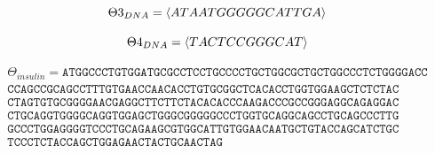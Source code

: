 \documentclass[a4paper, 18pt]{book} %
\begin{document}
\begin{equation}
{\Theta3}_{DNA} = \langle ATA ATGG GGG CAT TGA \rangle\\
\end{equation}

\begin{equation}
{\Theta4}_{DNA} = \langle TAC TCC GGG CAT\rangle\\
\end{equation}

\begin{multline}
\Theta_{insulin} =  \texttt{ATGGCCCTGTGGATGCGCCTCCTGCCCCTGCTGGCGCTGCTGGCCCTCTGGGGACC}\\
\texttt{CCAGCCGCAGCCTTTGTGAACCAACACCTGTGCGGCTCACACCTGGTGGAAGCTCTCTAC}\\
\texttt{CTAGTGTGCGGGGAACGAGGCTTCTTCTACACACCCAAGACCCGCCGGGAGGCAGAGGAC}\\
\texttt{CTGCAGGTGGGGCAGGTGGAGCTGGGCGGGGGCCCTGGTGCAGGCAGCCTGCAGCCCTTG}\\
\texttt{GCCCTGGAGGGGTCCCTGCAGAAGCGTGGCATTGTGGAACAATGCTGTACCAGCATCTGC}\\
\texttt{TCCCTCTACCAGCTGGAGAACTACTGCAACTAG}
\end{multline}
\end{document}
